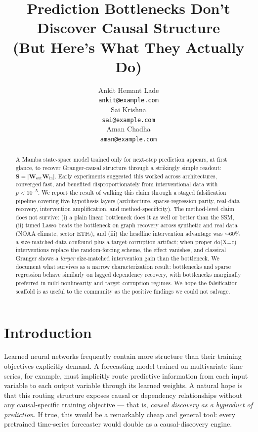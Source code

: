 \documentclass{article}
\title{Prediction Bottlenecks Don't Discover Causal Structure\\
(But Here's What They Actually Do)}
\author{%
  Ankit Hemant Lade\\
  \texttt{ankit@example.com}\\
  \And
  Sai Krishna\\
  \texttt{sai@example.com}\\
  \And
  Aman Chadha\\
  \texttt{aman@example.com}\\
}
\begin{document}
\maketitle

\begin{abstract}
A Mamba state-space model trained only for next-step prediction appears,
at first glance, to recover Granger-causal structure through a strikingly
simple readout: $\mathbf{S} = |\mathbf{W}_{\text{out}} \mathbf{W}_{\text{in}}|$.
Early experiments suggested this worked across architectures, converged
fast, and benefited disproportionately from interventional data with
$p < 10^{-5}$. We report the result of walking this claim through a
staged falsification pipeline covering five hypothesis layers
(architecture, sparse-regression parity, real-data recovery, intervention
amplification, and method-specificity). The method-level claim does not
survive: (i) a plain linear bottleneck does it as well or better than
the SSM, (ii) tuned Lasso beats the bottleneck on graph recovery across
synthetic and real data (NOAA climate, sector ETFs), and (iii) the
headline intervention advantage was $\sim$60\% a size-matched-data
confound plus a target-corruption artifact; when proper do(X=c)
interventions replace the random-forcing scheme, the effect vanishes,
and classical Granger shows a \emph{larger} size-matched intervention
gain than the bottleneck. We document what survives as a narrow
characterization result: bottlenecks and sparse regression behave
similarly on lagged dependency recovery, with bottlenecks marginally
preferred in mild-nonlinearity and target-corruption regimes. We hope
the falsification scaffold is as useful to the community as the
positive findings we could not salvage.
\end{abstract}

\section{Introduction}

Learned neural networks frequently contain more structure than their
training objectives explicitly demand. A forecasting model trained on
multivariate time series, for example, must implicitly route predictive
information from each input variable to each output variable through
its learned weights. A natural hope is that this routing structure
exposes causal or dependency relationships without any causal-specific
training objective — that is, \emph{causal discovery as a byproduct of
prediction}. If true, this would be a remarkably cheap and general
tool: every pretrained time-series forecaster would double as a
causal-discovery engine.
\end{document}
